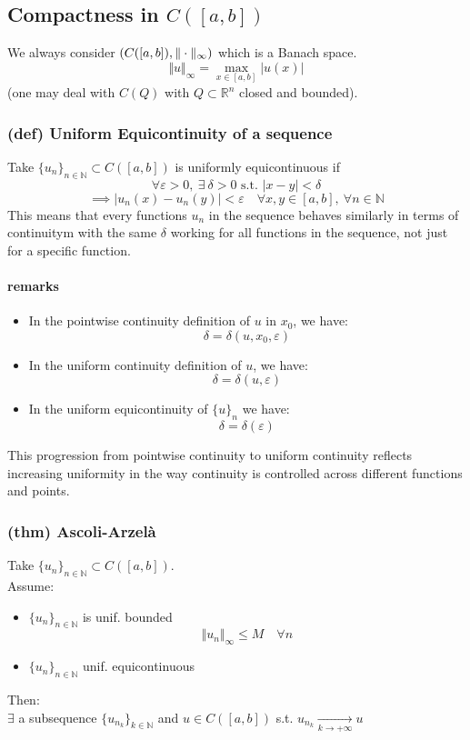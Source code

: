 \subsection{Compactness in $C([a,b])$}
We always consider $(C([a,b]),\Vert \cdot \Vert_\infty)$ which is a Banach space.
$$\Vert u\Vert_\infty =\max_{x\in [a,b]}|u(x)|$$
(one may deal with $C(Q)$ with $Q\subset \mathbb R^n$ closed and bounded).
\subsubsection{(def) Uniform Equicontinuity of a sequence}
Take $\{u_n\}_{n\in \mathbb N}\subset C([a,b])$ is uniformly equicontinuous if $$\forall \varepsilon>0,\ \exists\ \delta >0 \text{ s.t. }|x-y|<\delta$$ 
$$\implies |u_n(x)-u_n(y)|<\varepsilon\quad \forall x,y\in [a,b], \ \forall n\in \mathbb N$$
This means that every functions $u_n$ in the sequence behaves similarly in terms of continuitym with the same $\delta$ working for all functions in the sequence, not just for a specific function.

\paragraph{remarks}
\begin{itemize}
    \item In the pointwise continuity definition of $u$ in $x_0$, we have:
    $$ \delta = \delta(u,x_0,\varepsilon)$$
    \item In the uniform continuity definition of $u$, we have:
    $$ \delta = \delta(u,\varepsilon)$$
    \item In the uniform equicontinuity of $\{u\}_n$ we have:
    $$\delta = \delta(\varepsilon)$$
\end{itemize}
This progression from pointwise continuity to uniform continuity reflects increasing uniformity in the way continuity is controlled across different functions and points.
\subsubsection{(thm) Ascoli-Arzelà}
Take $\{u_n\}_{n\in \mathbb N}\subset C([a,b])$.\\
Assume:
\begin{itemize}
    \item $\{u_n\}_{n\in \mathbb N}$ is unif. bounded
    $$\Vert u_n\Vert_\infty\leq M\quad\forall n$$
    \item $\{u_n\}_{n\in \mathbb N}$ unif. equicontinuous
\end{itemize}
Then:\\
$\exists$ a subsequence $\{u_{n_k}\}_{k\in \mathbb N}$ and $u\in C([a,b])$ s.t. $u_{n_k}\xrightarrow[k\to+\infty]{}u$
